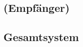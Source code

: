\clearpage
\subsection{\Master (Empf\"anger)}
\label{subsec:simu:ask:recv}


\subsection{Gesamtsystem}
\label{subsec:simu:ask:total}
